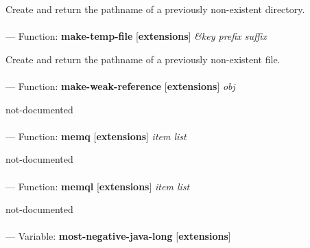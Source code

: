 \begin{adjustwidth}{5em}{5em}
Create and return the pathname of a previously non-existent directory.
\end{adjustwidth}

\paragraph{}
\label{EXTENSIONS:MAKE-TEMP-FILE}
--- Function: \textbf{make-temp-file} [\textbf{extensions}] \textit{\&key prefix suffix}

\begin{adjustwidth}{5em}{5em}
Create and return the pathname of a previously non-existent file.
\end{adjustwidth}

\paragraph{}
\label{EXTENSIONS:MAKE-WEAK-REFERENCE}
--- Function: \textbf{make-weak-reference} [\textbf{extensions}] \textit{obj}

\begin{adjustwidth}{5em}{5em}
not-documented
\end{adjustwidth}

\paragraph{}
\label{EXTENSIONS:MEMQ}
--- Function: \textbf{memq} [\textbf{extensions}] \textit{item list}

\begin{adjustwidth}{5em}{5em}
not-documented
\end{adjustwidth}

\paragraph{}
\label{EXTENSIONS:MEMQL}
--- Function: \textbf{memql} [\textbf{extensions}] \textit{item list}

\begin{adjustwidth}{5em}{5em}
not-documented
\end{adjustwidth}

\paragraph{}
\label{EXTENSIONS:MOST-NEGATIVE-JAVA-LONG}
--- Variable: \textbf{most-negative-java-long} [\textbf{extensions}] \textit{}


